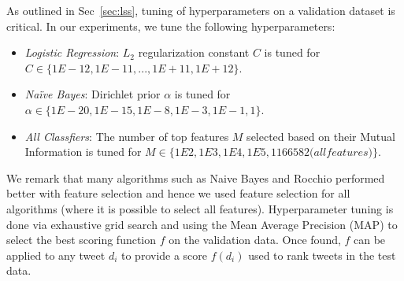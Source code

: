 As outlined in Sec~\ref{sec:lss}, tuning of hyperparameters on a validation
dataset is critical.  In our experiments, we tune the following hyperparameters:
\begin{itemize}
\item \textit{Logistic Regression}: $L_2$ regularization constant $C$ is tuned for $C \in \{1E-12, 1E-11, ..., 1E+11, 1E+12\}$.
\item \textit{Na\"{i}ve Bayes}: Dirichlet prior $\alpha$ is tuned for $\alpha \in \{1E-20, 1E-15, 1E-8, 1E-3, 1E-1, 1\}$.
\item \textit{All Classfiers}: The number of top features $M$ selected based on their Mutual Information is tuned for $M \in \{1E2, 1E3, 1E4, 1E5, 1166582 \mathrm(all features) \}$.
\end{itemize}
We remark that many algorithms such as Naive Bayes and Rocchio
performed better with feature selection and hence we used feature
selection for all algorithms (where it is possible to select all
features).  Hyperparameter tuning is done via exhaustive grid search
and using the Mean Average Precision
(MAP) to select the best scoring function $f$ on the validation data.
Once found, $f$ can be applied to any tweet $d_i$ to provide a score $f(d_i)$
used to rank tweets in the test data.
%
%
